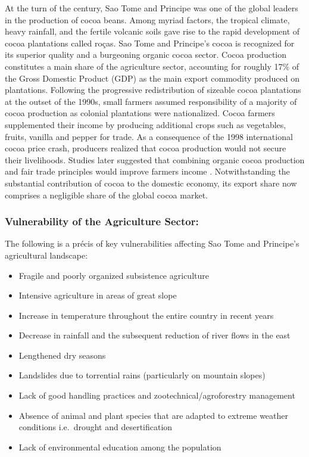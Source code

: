 \documentclass[
]{book}
\providecommand{\tightlist}{%
  \setlength{\itemsep}{0pt}\setlength{\parskip}{0pt}}
\begin{document}
At the turn of the century, Sao Tome and Principe was one of the global leaders in the production of cocoa beans. Among myriad factors, the tropical climate, heavy rainfall, and the fertile volcanic soils gave rise to the rapid development of cocoa plantations called roças. Sao Tome and Principe's cocoa is recognized for its superior quality and a burgeoning organic cocoa sector. Cocoa production constitutes a main share of the agriculture sector, accounting for roughly 17\% of the Gross Domestic Product (GDP) as the main export commodity produced on plantations. Following the progressive redistribution of sizeable cocoa plantations at the outset of the 1990s, small farmers assumed responsibility of a majority of cocoa production as colonial plantations were nationalized. Cocoa farmers supplemented their income by producing additional crops such as vegetables, fruits, vanilla and pepper for trade. As a consequence of the 1998 international cocoa price crash, producers realized that cocoa production would not secure their livelihoods. Studies later suggested that combining organic cocoa production and fair trade principles would improve farmers income . Notwithstanding the substantial contribution of cocoa to the domestic economy, its export share now comprises a negligible share of the global cocoa market.

\hypertarget{vulnerability-of-the-agriculture-sector}{%
\subsubsection{Vulnerability of the Agriculture Sector:}\label{vulnerability-of-the-agriculture-sector}}

The following is a précis of key vulnerabilities affecting Sao Tome and Principe's agricultural landscape:

\begin{itemize}
\tightlist
\item
  Fragile and poorly organized subsistence agriculture
\item
  Intensive agriculture in areas of great slope
\item
  Increase in temperature throughout the entire country in recent years
\item
  Decrease in rainfall and the subsequent reduction of river flows in the east
\item
  Lengthened dry seasons
\item
  Landslides due to torrential rains (particularly on mountain slopes)
\item
  Lack of good handling practices and zootechnical/agroforestry management
\item
  Absence of animal and plant species that are adapted to extreme weather conditions i.e.~drought and desertification
\item
  Lack of environmental education among the population
\end{itemize}
\end{document}
